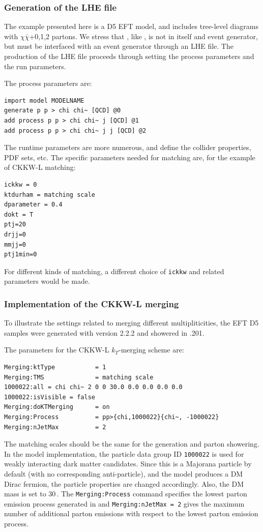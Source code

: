 \subsubsection{Generation of the LHE file}

The example presented here is a D5 EFT model, and
includes tree-level diagrams with $\chi\bar\chi$+0,1,2 partons.
We stress that \madgraph, like \powheg, is not in itself and event generator, but must be interfaced 
with an event generator through an LHE file.  The production of the LHE file proceeds through setting the 
process parameters and the run parameters.

The process parameters are:
\begin{verbatim}
import model MODELNAME
generate p p > chi chi~ [QCD] @0
add process p p > chi chi~ j [QCD] @1
add process p p > chi chi~ j j [QCD] @2
\end{verbatim}

The runtime parameters are more numerous, and define the
collider properties, PDF sets, etc.   The specific parameters
needed for matching are, for the example of CKKW-L matching:
\begin{verbatim}
ickkw = 0
ktdurham = matching scale
dparameter = 0.4
dokt = T
ptj=20
drjj=0
mmjj=0
ptj1min=0
\end{verbatim}
For different kinds of matching, a different choice of \texttt{ickkw} and
related parameters would be made.


\subsubsection{Implementation of the CKKW-L merging}
\label{sec:match_implementation}
To illustrate the settings related to merging different multipliticities, the EFT D5 samples were generated with \madgraph version 2.2.2 and showered in \pythiaEight.201.


The \pythiaEight parameters for the CKKW-L $k_T$-merging scheme are:
\begin{verbatim}
Merging:ktType           = 1
Merging:TMS              = matching scale
1000022:all = chi chi~ 2 0 0 30.0 0.0 0.0 0.0 0.0 
1000022:isVisible = false
Merging:doKTMerging      = on
Merging:Process          = pp>{chi,1000022}{chi~, -1000022}
Merging:nJetMax          = 2
\end{verbatim}
The matching scales should be the same for the generation and parton showering.
In the model implementation, the particle data group ID \texttt{1000022} is used for weakly
interacting dark matter candidates.   Since this is a Majorana particle by default (with no
corresponding anti-particle), and the model produces a DM Dirac fermion, the particle properties
are changed accordingly.  Also, the DM mass is set to 30\,\gev.
The \texttt{Merging:Process} command specifies the lowest parton emission process generated in \madgraph and \texttt{Merging:nJetMax = 2} gives the maximum number of additional parton emissions with respect to the lowest parton emission process. 

